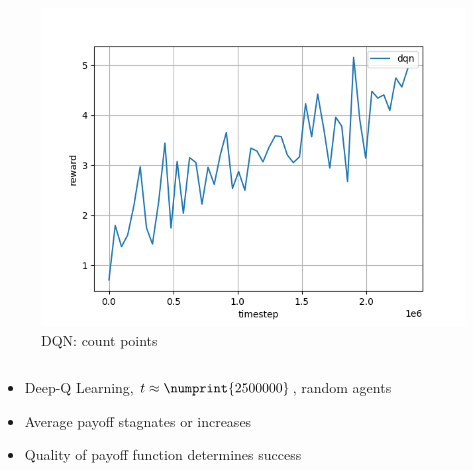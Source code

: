 \begin{frame}
\begin{columns}[t]
\begin{column}{.5\textwidth}
\begin{figure}
\includegraphics[height=.5\textheight]{dqn-specific-payoff.png}
\caption{DQN: count points}
\end{figure}
\end{column}

\end{columns}

\begin{itemize}
\item Deep-Q Learning, $t \approx \numprint{2500000}$, random agents
\item Average payoff stagnates or increases
\item Quality of payoff function determines success
\end{itemize}
\end{frame}


